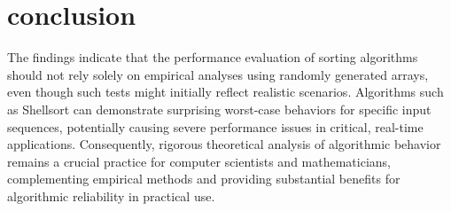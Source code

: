 \section{conclusion}

The findings indicate that the performance evaluation of sorting algorithms should not rely solely on empirical analyses using randomly generated arrays, even though such tests might initially reflect realistic scenarios.
Algorithms such as Shellsort can demonstrate surprising worst-case behaviors for specific input sequences, potentially causing severe performance issues in critical, real-time applications.
Consequently, rigorous theoretical analysis of algorithmic behavior remains a crucial practice for computer scientists and mathematicians, complementing empirical methods and providing substantial benefits for algorithmic reliability in practical use.
